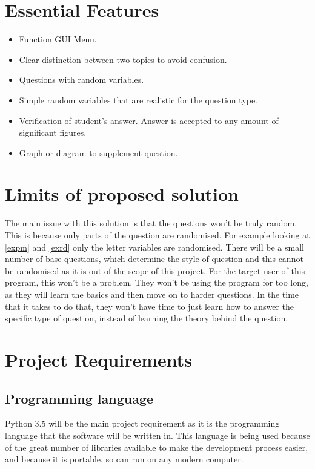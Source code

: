 \section{Essential Features}
\begin{itemize}
	\item{Function GUI Menu.}
	\item{Clear distinction between two topics to avoid confusion.}
	\item{Questions with random variables.}
	\item{Simple random variables that are realistic for the question type.}
	\item{Verification of student's answer. Answer is accepted to any amount of significant figures.}
	\item{Graph or diagram to supplement question.}
\end{itemize}
\section{Limits of proposed solution}
The main issue with this solution is that the questions won't be truly random. This is because only parts of the question are randomised. For example looking at \ref{expm} and \ref{exrd} only the letter variables are randomised. There will be a small number of base questions, which determine the style of question and this cannot be randomised as it is out of the scope of this project. For the target user of this program, this won't be a problem. They won't be using the program for too long, as they will learn the basics and then move on to harder questions. In the time that it takes to do that, they won't have time to just learn how to answer the specific type of question, instead of learning the theory behind the question.

\section{Project Requirements}
\subsection{Programming language}
Python 3.5 will be the main project requirement as it is the programming language that the software will be written in. This language is being used because of the great number of libraries available to make the development process easier, and because it is portable, so can run on any modern computer.
